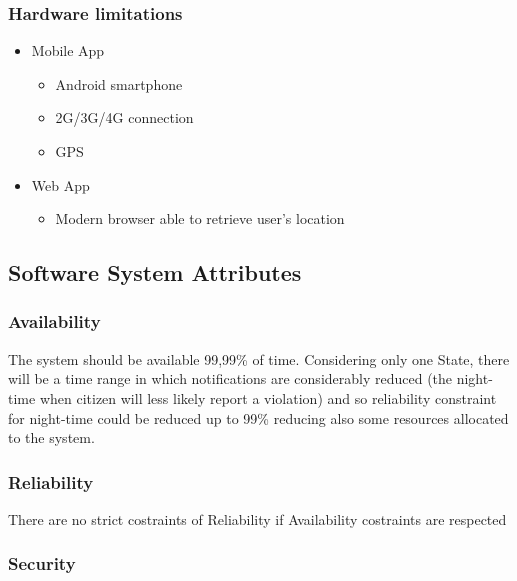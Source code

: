 \subsubsection{Hardware limitations}
\begin{itemize}
\item Mobile App
\begin{itemize}
\item Android smartphone
\item 2G/3G/4G connection
\item GPS
\end{itemize}
\item Web App
\begin{itemize}
\item Modern browser able to retrieve user's location
\end{itemize}
\end{itemize}
\subsection{Software System Attributes}
\subsubsection{Availability}
The system should be available 99,99\% of time. Considering only one State, there will be a time range 
in which notifications are considerably reduced (the night-time when citizen will less likely report 
a violation) and so reliability constraint for night-time could be reduced up to 99\% reducing also some 
resources allocated to the system.
\subsubsection{Reliability}
There are no strict costraints of Reliability if Availability costraints are respected
\subsubsection{Security}


